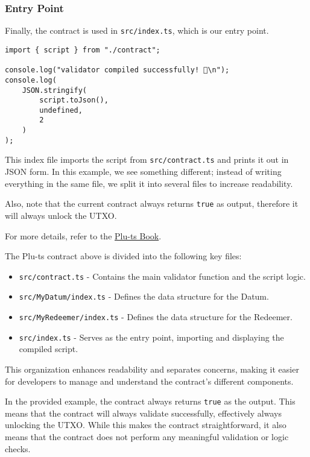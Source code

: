 \subsubsection{Entry Point}
Finally, the contract is used in \texttt{src/index.ts}, which is our entry point.

\begin{lstlisting}
import { script } from "./contract";

console.log("validator compiled successfully! 🎉\n");
console.log(
    JSON.stringify(
        script.toJson(),
        undefined,
        2
    )
);
\end{lstlisting}

This index file imports the script from \texttt{src/contract.ts} and prints it out in JSON form. In this example, we see something different; instead of writing everything in the same file, we split it into several files to increase readability.

Also, note that the current contract always returns \texttt{true} as output, therefore it will always unlock the UTXO.

For more details, refer to the \href{https://book.plu-ts.dev/}{Plu-ts Book}.

The Plu-ts contract above is divided into the following key files:
\begin{itemize}
  \item \texttt{src/contract.ts} - Contains the main validator function and the script logic.
  \item \texttt{src/MyDatum/index.ts} - Defines the data structure for the Datum.
  \item \texttt{src/MyRedeemer/index.ts} - Defines the data structure for the Redeemer.
  \item \texttt{src/index.ts} - Serves as the entry point, importing and displaying the compiled script.
\end{itemize}

This organization enhances readability and separates concerns, making it easier for developers to manage and understand the contract's different components. 

In the provided example, the contract always returns \texttt{true} as the output.
This means that the contract will always validate successfully, effectively always unlocking the UTXO. While this makes the contract straightforward, it also means that the contract does not perform any meaningful validation or logic checks. 